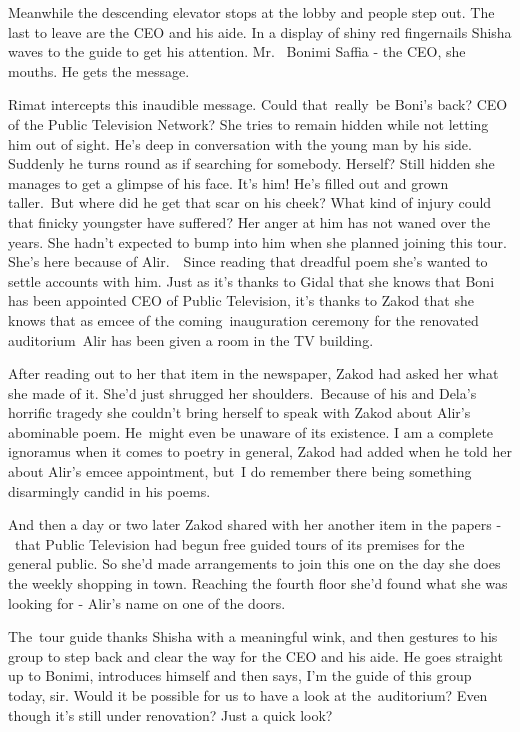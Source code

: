 \documentclass[letterpaper]{article}
\begin{document}
Meanwhile the descending elevator stops at the lobby and people step out. The last to leave are the CEO and his aide. In
a display of shiny red fingernails Shisha waves to the guide to get his attention. {\textquotedbl}Mr. ~Bonimi Saffia -
the CEO,{\textquotedbl} she mouths. He gets the message. 

Rimat intercepts this inaudible message. Could that~really~be Boni's back? CEO of the Public Television Network? She
tries to remain hidden while not letting him out of sight. He's deep in conversation with the young man by his side.
Suddenly he turns round as if searching for somebody. Herself? Still hidden she manages to get a glimpse of his face.
It's him! He{}'s filled out and grown taller.\ But where did he get that scar on his cheek? What kind of injury could
that finicky youngster have suffered? Her anger at him has not waned over the years. She hadn't expected to bump into
him when she planned joining this tour\textcolor[rgb]{0.8901961,0.42352942,0.039215688}{.} She's here because of
Alir.\ \ Since reading that dreadful poem she's wanted to settle accounts with him. Just as it's thanks to Gidal that
she knows that Boni has been appointed CEO of Public Television, it's thanks to Zakod that she knows that as emcee of
the coming\textcolor[rgb]{0.8901961,0.42352942,0.039215688}{\ }inauguration ceremony for the renovated auditorium\ Alir
has been given a room in the TV building. 

After reading out to her that item in the newspaper, Zakod had asked her what she made of it. She'd just shrugged her
shoulders.\ Because of his and Dela's horrific tragedy she couldn't bring herself to speak with Zakod about Alir's
abominable poem. He\ might even be unaware of its existence. {\textquotedbl}I am a complete ignoramus when it comes to
poetry in general,{\textquotedbl} Zakod had added when he told her about Alir's emcee appointment, {\textquotedbl}but~I
do remember there being something disarmingly candid in his poems{\textquotedbl}. \ 

And then a day or two later Zakod shared with her another item in the papers -\ that Public Television had begun free
guided tours of its premises for the general public. So she'd made arrangements to join this one on the day she does
the weekly shopping in town. Reaching the fourth floor she'd found what she was looking for - Alir's name on one of the
doors.\ 

The~tour guide thanks Shisha with a meaningful wink, and then gestures to his group to step back and clear the way for
the CEO and his aide. He goes straight up to Bonimi, introduces himself and then says, {\textquotedbl}I'm the guide of
this group today, sir. Would it be possible for us to have a look at the~auditorium? Even though it's still under
renovation? Just a quick look?{\textquotedbl} 
\end{document}
